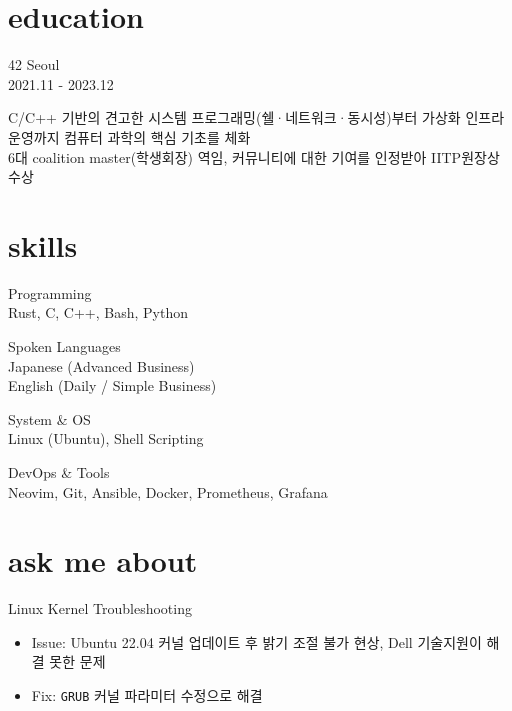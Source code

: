 \documentclass[10pt, a4paper]{article}
\newcommand{\dates}[1]{\hfill {\small\color{lightGray} #1}}
\begin{document}
\noindent
\begin{minipage}[t]{0.34\textwidth} %

    \section*{\huge{education}}
    42 Seoul \\ 
    \dates{2021.11 - 2023.12}
    
    \vspace{0.5em}
   
    \small{C/C++ 기반의 견고한 시스템 프로그래밍(쉘·네트워크·동시성)부터 가상화 인프라 운영까지 컴퓨터 과학의 핵심 기초를 체화}\\
    \small{6대 coalition master(학생회장) 역임, 커뮤니티에 대한 기여를 인정받아 IITP원장상 수상}

    \vspace{1.0em}

    \section*{\huge{ skills }}
    Programming \\
    \small{ Rust, C, C++, Bash, Python }
    
    \vspace{0.5em}
    Spoken Languages \\
    \small{ Japanese (Advanced Business) \\
    English (Daily / Simple Business) }    

    \vspace{0.5em}
    System \& OS \\
    \small{ Linux (Ubuntu), Shell Scripting }
    
    \vspace{0.5em}
    DevOps \& Tools \\
    \small{ Neovim, Git, Ansible, Docker, Prometheus, Grafana }

    \vspace{1.0em}

    \section*{\huge{ask me about}}
    Linux Kernel Troubleshooting
    \begin{itemize}[leftmargin=1em, label=\textbullet]
        \item Issue: Ubuntu 22.04 커널 업데이트 후 밝기 조절 불가 현상, Dell 기술지원이 해결 못한 문제
        \item Fix: \texttt{GRUB} 커널 파라미터 수정으로 해결
    \end{itemize}

\end{minipage}
\end{document}
